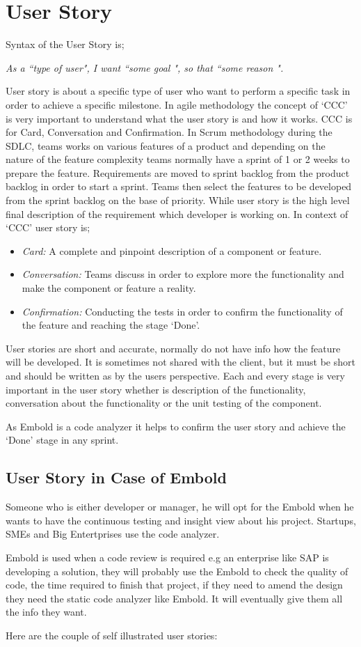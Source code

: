 \section{User Story}
Syntax of the User Story is; \par
\emph{As a ``type of user", I want  ``some goal ", so that ``some reason ".} ~\cite{story}\par
User story is about a specific type of user who want to perform a specific task in order to achieve a specific milestone. In agile methodology the concept of `CCC' is very important to understand what the user story is and how it works. CCC is for Card, Conversation and Confirmation. In Scrum methodology during the SDLC, teams works on various features of a product and depending on the nature of the feature complexity teams normally have a sprint of 1 or 2 weeks to prepare the feature. Requirements are moved to sprint backlog from the product backlog in order to start a sprint. Teams then select the features to be developed from the sprint backlog on the base of priority. While user story is the high level final description of the requirement which  developer is working on. In context of `CCC' user story is;
\begin{itemize}
\item\emph{Card:} A complete and pinpoint description of a component or feature. 
\item\emph{Conversation:} Teams discuss in order to explore more the functionality and make the component or feature a reality.
\item\emph{Confirmation:} Conducting the tests in order to confirm the functionality of the feature and reaching the stage `Done'.
\end{itemize}\par
User stories are short and accurate, normally do not have info how the feature will be developed. It is sometimes not shared with the client, but it must be short and should be written as by the users perspective. Each and every stage is very important in the user story whether is description of the functionality, conversation about the functionality or the unit testing of the component. ~\cite{Agile}\par
As Embold is a code analyzer it helps to confirm the user story and achieve the `Done' stage in any sprint.
\subsection{User Story in Case of Embold}
Someone who is either developer or manager, he will opt for the Embold when he wants to have the continuous testing and insight view about his project. Startups, SMEs and Big Entertprises use the code analyzer. \par Embold is used when a code review is required e.g an enterprise like SAP is developing a solution, they will probably use the Embold to check the quality of code,  the time required to finish that project, if they need to amend the design they need the static code analyzer like Embold. It will eventually give them all the info they want.\par
Here are the couple of self illustrated user stories: 
